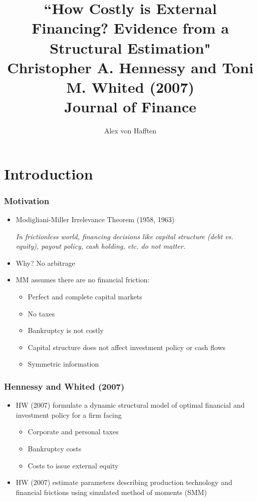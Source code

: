 \documentclass[usenames,dvipsnames, handout]{beamer}
\title[HW (2007)]{``How Costly is External Financing? Evidence from a Structural Estimation"\\Christopher A. Hennessy and Toni M. Whited (2007)\\Journal of Finance}
\author{Alex von Hafften}
\institute{UW-Madison}
\begin{document}
\begin{frame}
\titlepage
\end{frame}

\section{Introduction}

\begin{frame}
\frametitle{Motivation}
\small
\begin{itemize}
\item Modigliani-Miller Irrelevance Theorem (1958, 1963) 

\bigskip

\textit{In frictionless world, financing decisions like capital structure (debt vs. equity), payout policy, cash holding, etc. do not matter.}
\bigskip
\item Why? No arbitrage
\bigskip
\item MM assumes there are no financial friction:
\begin{itemize}
\item Perfect and complete capital markets
\item No taxes
\item Bankruptcy is not costly
\item Capital structure does not affect investment policy or cash flows
\item Symmetric information
\end{itemize}
\end{itemize}
\end{frame}



\begin{frame}
\frametitle{Hennessy and Whited (2007)}
\small
\begin{itemize}
\item HW (2007) formulate a dynamic structural model of optimal financial and investment policy for a firm facing
\begin{itemize}
\item Corporate and personal taxes
\item Bankruptcy costs
\item Costs to issue external equity
\end{itemize}
\bigskip
\item HW (2007) estimate parameters describing production technology and financial frictions using simulated method of moments (SMM)
\end{itemize}
\end{frame}
\end{document}
